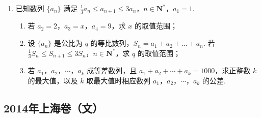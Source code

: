 \begin{description}
\begin{enumerate}[leftmargin=5pt]
\begin{enumerate}
\item 求证：点 \(A(1,2)\)，\(B(-1,0)\) 被直线 \(x + y - 1 = 0\) 分隔；
\item 若直线 \(y = kx\) 是曲线 \(x^2 - 4y^2 = 1\) 的分隔线，求实数 \(k\) 的取值范围；
\item 动点 \(M\) 到点 \(Q(0,2)\) 的距离与到 \(y\) 轴的距离之积为 1，设点 \(M\) 的轨迹为 \(E\)，求证：通过原点的直线中，有且仅有一条直线是 \(E\) 的分隔线.
\end{enumerate}

        \item 已知数列 \(\{a_{n}\}\) 满足 \(\frac{1}{3} a_{n} \leqslant a_{n+1} \leqslant 3a_{n}\)，\(n \in \mathbf{N}^{*}\)，\(a_{1} = 1\).

\begin{enumerate}
\item 若 \(a_{2} = 2\)，\(a_{3} = x\)，\(a_{4} = 9\)，求 \(x\) 的取值范围；
\item 设 \(\{a_{n}\}\) 是公比为 \(q\) 的等比数列，\(S_{n} = a_{1} + a_{2} + \dots + a_{n}\). 若 \(\frac{1}{3} S_{n} \leqslant S_{n+1} \leqslant 3S_{n}\)，\(n \in \mathbf{N}^{*}\)，求 \(q\) 的取值范围；
\item 若 \(a_{1}\)，\(a_{2}\)，\(\cdots\)，\(a_{k}\) 成等差数列，且 \(a_{1} + a_{2} + \cdots + a_{k} = 1000\)，求正整数 \(k\) 的最大值，以及 \(k\) 取最大值时相应数列 \(a_{1}\)，\(a_{2}\)，\(\cdots\)，\(a_{k}\) 的公差.
\end{enumerate}

    \end{enumerate}

\end{description}


\subsection{2014年上海卷（文）}\label{gk:2014年上海卷（文）}

